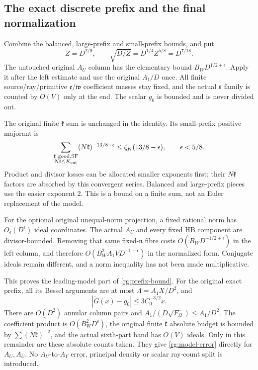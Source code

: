 \subsection{The exact discrete prefix and the final normalization}
\label{rg:assembly-proof}
Combine the balanced, large-prefix and small-prefix bounds, and put
\begin{equation}\label{rg:balancing}
 Z=D^{2/9},\qquad
 \sqrt{D/Z}=D^{1/4}Z^{5/8}=D^{7/18}.
\end{equation}
The untouched original \(A_U\) column has the elementary bound
\(B_WD^{1/2+\epsilon}\).
Apply it after the left estimate and use the original \(A_1/D\) once.
All finite source/ray/primitive \(\mathfrak e/\mathfrak w\)
coefficient masses stay fixed, and the actual \(\mathfrak s\)
family is counted by \(O(V)\) only at the end.
The scalar \(g_0\) is bounded and is never divided out.

The original finite \(\mathfrak k\) sum is unchanged in the identity.
Its small-prefix positive majorant is
\begin{equation}\label{rg:k-majorant}
 \sum_{\substack{\mathfrak k\ {\rm good,SF}\\
                      N\mathfrak k\le K_{\rm cut}}}
       (N\mathfrak k)^{-13/8+\epsilon}
 \le\zeta_K(13/8-\epsilon),\qquad \epsilon<5/8 .
\end{equation}
Product and divisor losses can be allocated smaller exponents first;
their \(N\mathfrak k\) factors are absorbed by this convergent series.
Balanced and large-prefix pieces use the easier exponent \(2\).
This is a bound on a finite sum, not an Euler replacement of the model.

For the optional original unequal-norm projection, a fixed rational
norm has \(O_\epsilon(D^\epsilon)\) ideal coordinates.
The actual \(A_U\) and every fixed HB component are divisor-bounded.
Removing that same fixed-\(\mathfrak n\) fibre costs
\(O(B_WD^{-1/2+\epsilon})\) in the left column, and therefore
\(O(B_W^2A_1VD^{-1+\epsilon})\) in the normalized form.
Conjugate ideals remain different, and a norm inequality has not
been made multiplicative.

This proves the leading-model part of \eqref{rg:prefix-bound}.
For the original exact prefix, all its Bessel arguments are at most
\(\Lambda=A_1X/D^2\), and
\[
 |\dot G(x)-g_0|\le3C_0^{-3/2}x .
\]
There are \(O(D^2)\) annular column pairs and
\(A_1/(D\sqrt{F_\Omega})\le A_1/D^2\).
The coefficient product is \(O(B_W^2D^\epsilon)\),
the original finite \(\mathfrak k\) absolute budget is bounded by
\(\sum(N\mathfrak k)^{-2}\), and the actual sixth-part band has
\(O(V)\) ideals. Only in this remainder are these absolute counts
taken. They give \eqref{rg:model-error} directly for \(A_U,A_U\).
No \(A_U\)-to-\(A_Y\) error, principal density or scalar ray-count
split is introduced.

